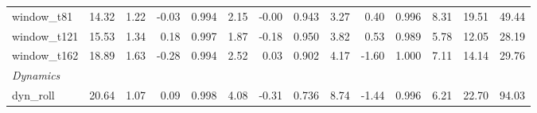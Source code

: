 \begin{table}[t]
{\begin{tabular}{lrrrrrrrrrrrrr}
window\_t81 & 14.32 & 1.22 & -0.03 & 0.994 & 2.15 & -0.00 & 0.943 & 3.27 & 0.40 & 0.996 & 8.31 & 19.51 & 49.44 \\
window\_t121 & 15.53 & 1.34 & 0.18 & 0.997 & 1.87 & -0.18 & 0.950 & 3.82 & 0.53 & 0.989 & 5.78 & 12.05 & 28.19 \\
window\_t162 & 18.89 & 1.63 & -0.28 & 0.994 & 2.52 & 0.03 & 0.902 & 4.17 & -1.60 & 1.000 & 7.11 & 14.14 & 29.76 \\
\midrule
\multicolumn{14}{l}{\textit{Dynamics}} \\
dyn\_roll & 20.64 & 1.07 & 0.09 & 0.998 & 4.08 & -0.31 & 0.736 & 8.74 & -1.44 & 0.996 & 6.21 & 22.70 & 94.03 \\
\bottomrule
\end{tabular}}
\end{table}